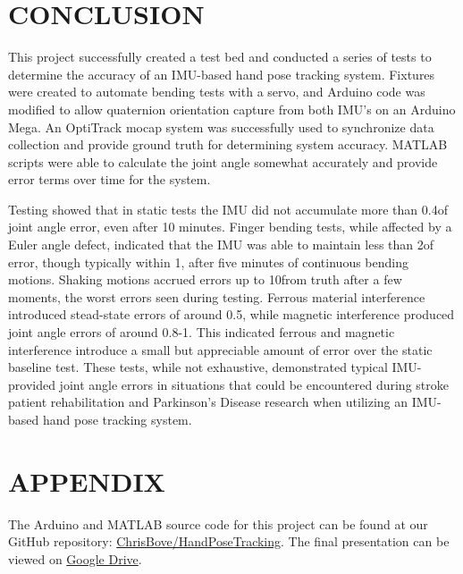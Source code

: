 \documentclass[letterpaper, 10 pt, conference]{ieeeconf}  %
\begin{document}
\section{CONCLUSION}
This project successfully created a test bed and conducted a series of tests to determine the accuracy of an IMU-based hand pose tracking system. Fixtures were created to automate bending tests with a servo, and Arduino code was modified to allow quaternion orientation capture from both IMU's on an Arduino Mega. An OptiTrack mocap system was successfully used to synchronize data collection and provide ground truth for determining system accuracy. MATLAB scripts were able to calculate the joint angle somewhat accurately and provide error terms over time for the system. 

Testing showed that in static tests the IMU did not accumulate more than 0.4\degree of joint angle error, even after 10 minutes. Finger bending tests, while affected by a Euler angle defect, indicated that the IMU was able to maintain less than 2\degree of error, though typically within 1\degree, after five minutes of continuous bending motions. Shaking motions accrued errors up to 10\degree from truth after a few moments, the worst errors seen during testing. Ferrous material interference introduced stead-state errors of around 0.5\degree, while magnetic interference produced joint angle errors of around 0.8-1\degree. This indicated ferrous and magnetic interference introduce a small but appreciable amount of error over the static baseline test. These tests, while not exhaustive, demonstrated typical IMU-provided joint angle errors in situations that could be encountered during stroke patient rehabilitation and Parkinson's Disease research when utilizing an IMU-based hand pose tracking system. 

\addtolength{\textheight}{-12cm}   %

\section*{APPENDIX}
The Arduino and MATLAB source code for this project can be found at our GitHub repository:  \href{https://github.com/ChrisBove/HandPoseTracking}{ChrisBove/HandPoseTracking}.
The final presentation can be viewed on \href{https://docs.google.com/presentation/d/1VDLMp_ZAbCT3yII7-D-Xm1Q3-hwkLWy0UZxRYme4dzw/edit?usp=sharing}{Google Drive}.
\end{document}
